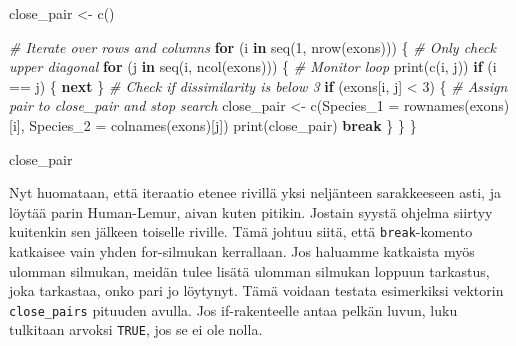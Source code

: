 \documentclass[
]{book}
\newenvironment{Shaded}{\begin{snugshade}}{\end{snugshade}}
\newcommand{\AttributeTok}[1]{\textcolor[rgb]{0.77,0.63,0.00}{#1}}
\newcommand{\CommentTok}[1]{\textcolor[rgb]{0.56,0.35,0.01}{\textit{#1}}}
\newcommand{\ControlFlowTok}[1]{\textcolor[rgb]{0.13,0.29,0.53}{\textbf{#1}}}
\newcommand{\DecValTok}[1]{\textcolor[rgb]{0.00,0.00,0.81}{#1}}
\newcommand{\FunctionTok}[1]{\textcolor[rgb]{0.00,0.00,0.00}{#1}}
\newcommand{\NormalTok}[1]{#1}
\newcommand{\OtherTok}[1]{\textcolor[rgb]{0.56,0.35,0.01}{#1}}
\newcommand{\SpecialCharTok}[1]{\textcolor[rgb]{0.00,0.00,0.00}{#1}}
\begin{document}
\begin{Shaded}
\begin{Highlighting}[]
\NormalTok{close\_pair }\OtherTok{\textless{}{-}} \FunctionTok{c}\NormalTok{()}

\CommentTok{\# Iterate over rows and columns}
\ControlFlowTok{for}\NormalTok{ (i }\ControlFlowTok{in} \FunctionTok{seq}\NormalTok{(}\DecValTok{1}\NormalTok{, }\FunctionTok{nrow}\NormalTok{(exons))) \{}
  \CommentTok{\# Only check upper diagonal}
  \ControlFlowTok{for}\NormalTok{ (j }\ControlFlowTok{in} \FunctionTok{seq}\NormalTok{(i, }\FunctionTok{ncol}\NormalTok{(exons))) \{}
    \CommentTok{\# Monitor loop}
    \FunctionTok{print}\NormalTok{(}\FunctionTok{c}\NormalTok{(i, j))}
    \ControlFlowTok{if}\NormalTok{ (i }\SpecialCharTok{==}\NormalTok{ j) \{}
      \ControlFlowTok{next}
\NormalTok{    \}}
    \CommentTok{\# Check if dissimilarity is below 3}
    \ControlFlowTok{if}\NormalTok{ (exons[i, j] }\SpecialCharTok{\textless{}} \DecValTok{3}\NormalTok{) \{}
      \CommentTok{\# Assign pair to close\_pair and stop search}
\NormalTok{      close\_pair }\OtherTok{\textless{}{-}} \FunctionTok{c}\NormalTok{(}\AttributeTok{Species\_1 =} \FunctionTok{rownames}\NormalTok{(exons)[i],}
                      \AttributeTok{Species\_2 =} \FunctionTok{colnames}\NormalTok{(exons)[j])}
      \FunctionTok{print}\NormalTok{(close\_pair)}
      \ControlFlowTok{break}
\NormalTok{    \}}
\NormalTok{  \}}
\NormalTok{\}}

\NormalTok{close\_pair}
\end{Highlighting}
\end{Shaded}

Nyt huomataan, että iteraatio etenee rivillä yksi neljänteen sarakkeeseen asti, ja löytää parin Human-Lemur, aivan kuten pitikin. Jostain syystä ohjelma siirtyy kuitenkin sen jälkeen toiselle riville. Tämä johtuu siitä, että \texttt{break}-komento katkaisee vain yhden for-silmukan kerrallaan. Jos haluamme katkaista myös ulomman silmukan, meidän tulee lisätä ulomman silmukan loppuun tarkastus, joka tarkastaa, onko pari jo löytynyt. Tämä voidaan testata esimerkiksi vektorin \texttt{close\_pairs} pituuden avulla. Jos if-rakenteelle antaa pelkän luvun, luku tulkitaan arvoksi \texttt{TRUE}, jos se ei ole nolla.
\end{document}
